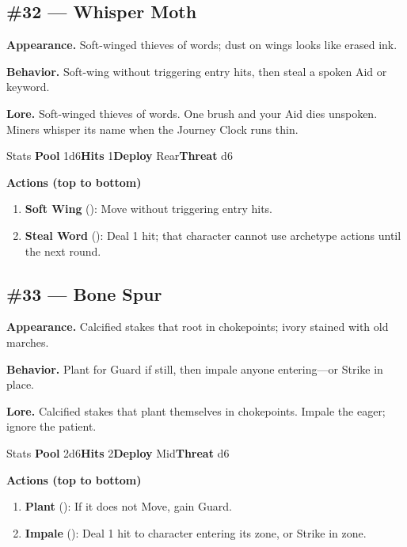 \subsection*{\#32 --- Whisper Moth}

\textbf{Appearance.} Soft-winged thieves of words; dust on wings looks like erased ink.

\textbf{Behavior.} Soft-wing without triggering entry hits, then steal a spoken Aid or keyword.

\textbf{Lore.} Soft-winged thieves of words. One brush and your Aid dies unspoken. Miners whisper its name when the Journey Clock runs thin.

\begin{monsterentry}{Stats}
\textbf{Pool} 1d6\quad\textbf{Hits} 1\quad\textbf{Deploy} Rear\quad\textbf{Threat} d6

\textbf{Actions (top to bottom)}
\begin{enumerate}\setlength{\itemsep}{0.15em}\setlength{\parskip}{0pt}
  \item \textbf{Soft Wing} (\easy): Move without triggering entry hits.
  \item \textbf{Steal Word} (\medium): Deal 1 hit; that character cannot use archetype actions until the next round.
\end{enumerate}
\end{monsterentry}

\subsection*{\#33 --- Bone Spur}

\textbf{Appearance.} Calcified stakes that root in chokepoints; ivory stained with old marches.

\textbf{Behavior.} Plant for Guard if still, then impale anyone entering---or Strike in place.

\textbf{Lore.} Calcified stakes that plant themselves in chokepoints. Impale the eager; ignore the patient.

\begin{monsterentry}{Stats}
\textbf{Pool} 2d6\quad\textbf{Hits} 2\quad\textbf{Deploy} Mid\quad\textbf{Threat} d6

\textbf{Actions (top to bottom)}
\begin{enumerate}\setlength{\itemsep}{0.15em}\setlength{\parskip}{0pt}
  \item \textbf{Plant} (\easy): If it does not Move, gain Guard.
  \item \textbf{Impale} (\medium): Deal 1 hit to character entering its zone, or Strike in zone.
\end{enumerate}
\end{monsterentry}

